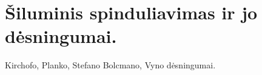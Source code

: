 \chapter{Šiluminis spinduliavimas ir jo dėsningumai.}
Kirchofo, Planko, Stefano Bolcmano, Vyno dėsningumai.
